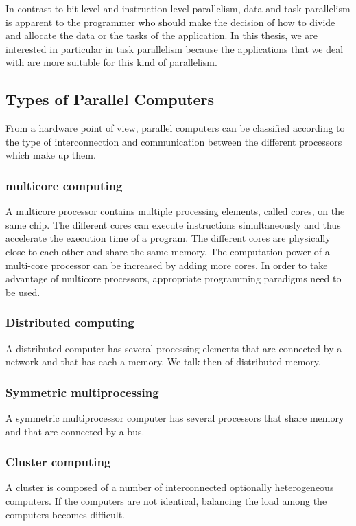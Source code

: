 In contrast to bit-level and instruction-level parallelism, data and task parallelism is apparent to the programmer who should make the decision of how to divide and allocate the data or the tasks of the application. In this thesis, we are interested in particular in task parallelism because the applications that we deal with are more suitable for this kind of parallelism.

\subsection{Types of Parallel Computers}

From a hardware point of view, parallel computers can be classified according to the type of interconnection and communication between the different processors which make up them.

\subsubsection{multicore computing}
A multicore processor contains multiple processing elements, called cores, on the same chip. The different cores can execute instructions simultaneously and thus accelerate the execution time of a program. The different cores are physically close to each other and share the same memory. The computation power of a multi-core processor can be increased by adding more cores. In order to take advantage of multicore processors, appropriate programming paradigms need to be used.  

\subsubsection{Distributed computing}
A distributed computer has several processing elements that are connected by a network and that has each a memory. We talk then of distributed memory.

\subsubsection{Symmetric multiprocessing}
A symmetric multiprocessor computer has several processors that share memory and that are connected by a bus.

\subsubsection{Cluster computing}
A cluster is composed of a number of interconnected optionally heterogeneous computers. If the computers are not identical, balancing the load among the computers becomes difficult.

